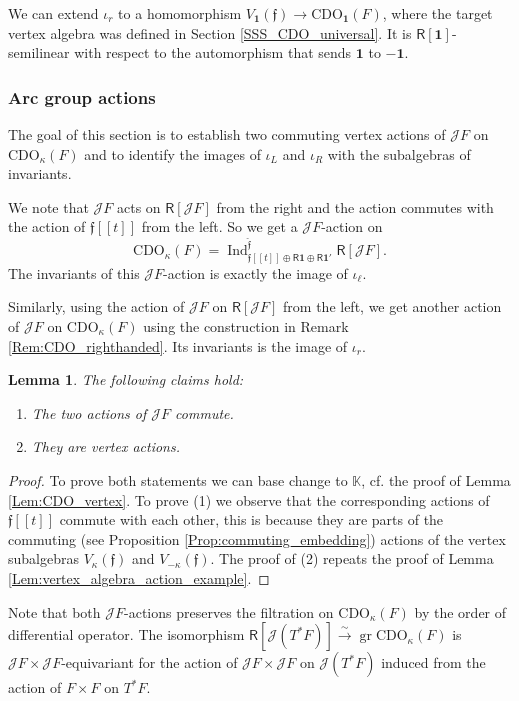 \documentclass{amsart}
\newtheorem{Lem}[Thm]{Lemma}
\theoremstyle{definition}
\newcommand{\Ring}{\mathsf{R}}
\newcommand{\gr}{\operatorname{gr}}
\newcommand{\Jet}{\mathscr{J}}
\newcommand{\ff}{\mathfrak{f}}
\newcommand{\CDO}{\mathrm{CDO}}
\newcommand{\bone}{\mathbf{1}}
\numberwithin{equation}{section}
\begin{document}
We can extend $\iota_r$ to a homomorphism $V_{\bone}(\ff)\rightarrow \CDO_{\bone}(F)$, where the target vertex algebra was defined in Section \ref{SSS_CDO_universal}. It is $\Ring[\mathbf{1}]$-semilinear with respect to the automorphism that sends $\mathbf{1}$ to $-\mathbf{1}$.

\subsubsection{Arc group actions}\label{SSS_arc_actions_CDO}
The goal of this section is to establish two commuting vertex actions of $\Jet F$ on $\CDO_\kappa(F)$
and to identify the images of $\iota_L$ and $\iota_R$ with the subalgebras of invariants. 

We note that $\Jet F$ acts on $\Ring[\Jet F]$ from the right and the action commutes with the action of $\mathfrak{f}[[t]]$ from the left.
So we get a $\Jet F$-action on 
$$\CDO_\kappa(F) = \operatorname{Ind}_{\mathfrak{f}[[t]]\oplus \Ring\mathbf{1}\oplus \Ring\mathbf{1}'}^{\hat{\mathfrak{f}}} \Ring[\Jet F].$$
The invariants of this $\Jet F$-action is exactly the image of $\iota_\ell$. 

Similarly, using the action of $\Jet F$ on $\Ring[\Jet F]$ from the left, we get another action of $\Jet F$
on $\CDO_\kappa(F)$ using the construction in 
Remark \ref{Rem:CDO_righthanded}. Its invariants is the image of $\iota_r$.

\begin{Lem}\label{Lem:arc_actions_CDO}
The following claims hold:
\begin{enumerate}
\item The two actions of $\Jet F$ commute.
\item They are vertex actions. 
\end{enumerate}
\end{Lem}
\begin{proof}
To prove both statements we can base change to $\mathbb{K}$, cf. the proof of Lemma \ref{Lem:CDO_vertex}. To prove (1) we observe that the corresponding actions of $\mathfrak{f}[[t]]$ commute with each other, this is because they are parts of the commuting (see Proposition \ref{Prop:commuting_embedding}) actions of the vertex subalgebras $V_\kappa(\mathfrak{f})$ and $V_{-\kappa}(\mathfrak{f})$. The proof of (2) repeats the proof of Lemma \ref{Lem:vertex_algebra_action_example}.
\end{proof}

Note that both $\Jet F$-actions preserves the filtration on $\CDO_\kappa(F)$ by the order of differential operator. The isomorphism $\Ring[\Jet(T^*F)]\xrightarrow{\sim} \gr \CDO_\kappa(F)$ is $\Jet F\times \Jet F$-equivariant for the action of $\Jet F\times \Jet F$ on $\Jet(T^*F)$ induced from the action of $F\times F$ on $T^*F$. 
\end{document}
